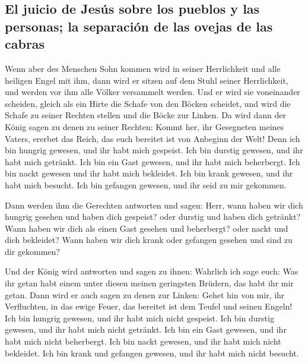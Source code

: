 \hypertarget{el-juicio-de-jesuxfas-sobre-los-pueblos-y-las-personas-la-separaciuxf3n-de-las-ovejas-de-las-cabras}{%
\subsection{El juicio de Jesús sobre los pueblos y las personas; la
separación de las ovejas de las
cabras}\label{el-juicio-de-jesuxfas-sobre-los-pueblos-y-las-personas-la-separaciuxf3n-de-las-ovejas-de-las-cabras}}

 Wenn aber des Menschen Sohn kommen wird in seiner
Herrlichkeit und alle heiligen Engel mit ihm, dann wird er sitzen auf
dem Stuhl seiner Herrlichkeit,  und werden vor ihm alle
Völker versammelt werden. Und er wird sie voneinander scheiden, gleich
als ein Hirte die Schafe von den Böcken scheidet,  und
wird die Schafe zu seiner Rechten stellen und die Böcke zur Linken.
 Da wird dann der König sagen zu denen zu seiner Rechten:
Kommt her, ihr Gesegneten meines Vaters, ererbet das Reich, das euch
bereitet ist von Anbeginn der Welt!  Denn ich bin hungrig
gewesen, und ihr habt mich gespeist. Ich bin durstig gewesen, und ihr
habt mich getränkt. Ich bin ein Gast gewesen, und ihr habt mich
beherbergt.  Ich bin nackt gewesen und ihr habt mich
bekleidet. Ich bin krank gewesen, und ihr habt mich besucht. Ich bin
gefangen gewesen, und ihr seid zu mir gekommen.

 Dann werden ihm die Gerechten antworten und sagen: Herr,
wann haben wir dich hungrig gesehen und haben dich gespeist? oder
durstig und haben dich getränkt?  Wann haben wir dich als
einen Gast gesehen und beherbergt? oder nackt und dich bekleidet?
 Wann haben wir dich krank oder gefangen gesehen und sind
zu dir gekommen?

 Und der König wird antworten und sagen zu ihnen:
Wahrlich ich sage euch: Was ihr getan habt einem unter diesen meinen
geringsten Brüdern, das habt ihr mir getan.  Dann wird er
auch sagen zu denen zur Linken: Gehet hin von mir, ihr Verfluchten, in
das ewige Feuer, das bereitet ist dem Teufel und seinen Engeln!
 Ich bin hungrig gewesen, und ihr habt mich nicht
gespeist. Ich bin durstig gewesen, und ihr habt mich nicht getränkt.
 Ich bin ein Gast gewesen, und ihr habt mich nicht
beherbergt. Ich bin nackt gewesen, und ihr habt mich nicht bekleidet.
Ich bin krank und gefangen gewesen, und ihr habt mich nicht besucht.

